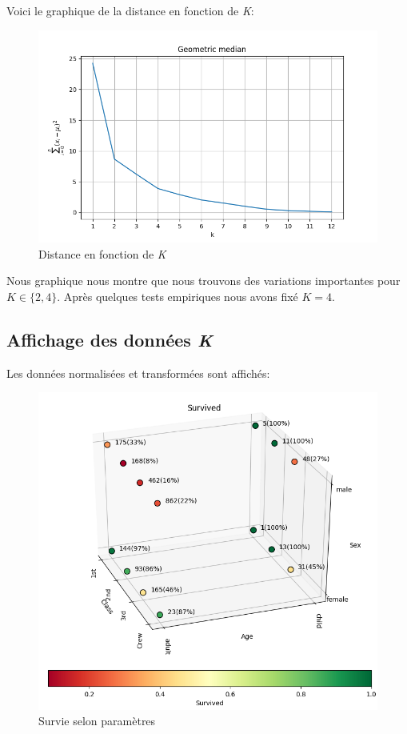 \documentclass[11pt, a4paper]{article}
\begin{document}
Voici le graphique de la distance en fonction de \textit{K}:

\begin{figure}[H]
    \begin{center}
        \includegraphics[width=.8\textwidth]{ex1_geometric_median}
    \end{center}
    \caption{Distance en fonction de \textit{K}}
    \label{Distance en fonction de \textit{K}}
\end{figure}

Nous graphique nous montre que nous trouvons des variations importantes pour $K\in\{2, 4\}$.
Après quelques tests empiriques nous avons fixé $K=4$.


\subsection{Affichage des données \textit{K}}

Les données normalisées et transformées sont affichés:

\begin{figure}[H]
    \begin{center}
        \includegraphics[width=.8\textwidth]{ex1_survived}
    \end{center}
    \caption{Survie selon paramètres}
    \label{Survie selon paramètres}
\end{figure}
\end{document}

